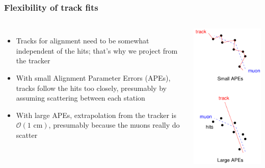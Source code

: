 \documentclass[compress]{beamer}
\begin{document}
\begin{frame}
\frametitle{Flexibility of track fits}
\begin{columns}
\begin{itemize}
\item Tracks for alignment need to be somewhat independent of the
hits; that's why we project from the tracker
\item With small Alignment Parameter Errors (APEs), tracks follow the
hits too closely, presumably by assuming scattering between each
station
\item With large APEs, extrapolation from the tracker is
$\mathcal{O}(\mbox{1 cm})$, presumably because the muons really do scatter
\end{itemize}

\includegraphics[width=\linewidth]{flexibility.pdf}
\end{columns}


\end{frame}
\end{document}
